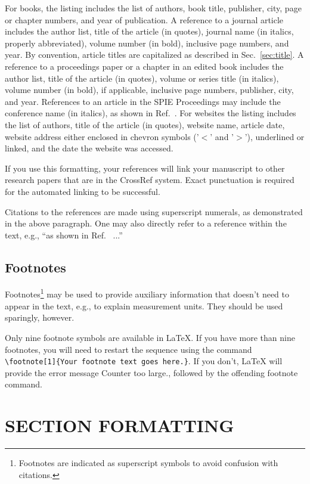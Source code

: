 \documentclass[nocompress]{spie}  %
\begin{document}
For books\cite{Lamport94,Alred03,Goossens97}, the listing includes the list of authors, book title, publisher, city, page or chapter numbers, and year of publication.  A reference to a journal article\cite{Metropolis53} includes the author list, title of the article (in quotes), journal name (in italics, properly abbreviated), volume number (in bold), inclusive page numbers, and year.  By convention\cite{Lamport94}, article titles are capitalized as described in Sec.~\ref{sec:title}.  A reference to a proceedings paper or a chapter in an edited book\cite{Gull89a} includes the author list, title of the article (in quotes), volume or series title (in italics), volume number (in bold), if applicable, inclusive page numbers, publisher, city, and year.  References to an article in the SPIE Proceedings may include the conference name (in italics), as shown in Ref.~. For websites\cite{Lees-Miller-LaTeX-course-1} the listing includes the list of authors, title of the article (in quotes), website name, article date, website address either enclosed in chevron symbols ('\(<\)' and '\(>\)'),  underlined or linked, and the date the website was accessed. 

If you use this formatting, your references will link your manuscript to other research papers that are in the CrossRef system. Exact punctuation is required for the automated linking to be successful. 

Citations to the references are made using superscript numerals, as demonstrated in the above paragraph.  One may also directly refer to a reference within the text, e.g., ``as shown in Ref.~ ...''

\subsection{Footnotes}
Footnotes\footnote{Footnotes are indicated as superscript symbols to avoid confusion with citations.} may be used to provide auxiliary information that doesn't need to appear in the text, e.g., to explain measurement units.  They should be used sparingly, however.  

Only nine footnote symbols are available in LaTeX. If you have more than nine footnotes, you will need to restart the sequence using the command  \verb|\footnote[1]{Your footnote text goes here.}|. If you don't, LaTeX will provide the error message {\ttfamily Counter too large.}, followed by the offending footnote command.

\section{SECTION FORMATTING}
\label{sec:sections}
\end{document}
